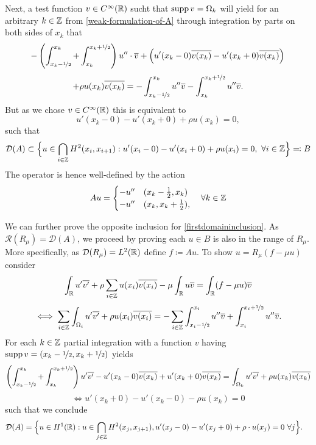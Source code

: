 Next, a test function $v \in C^{\infty}(\mathbb{R})$ sucht that $\operatorname{supp} v = \Omega_{k}$ will yield for an arbitrary $k \in \mathbb{Z}$ from \eqref{weak-formulation-of-A}   through integration by parts on both sides of $x_{k}$ that
	\[ -\left( \int_{x_{k}-\nicefrac{1}{2}}^{x_{k}} + \int_{x_{k}}^{x_{k} + \nicefrac{1}{2}}\right) u'' \cdot \overline{v} + \left( u'(x_{k}-0) \overline{v(x_{k})} - u'(x_{k} + 0) \overline{v(x_{k})} \right) \\ \]
	\[ +  \rho u(x_{k})\overline{v(x_{k})} = - \int_{x_{k} - \nicefrac{1}{2}}^{x_{k}} u'' \overline{v} - \int_{x_{k}}^{x_{k} + \nicefrac{1}{2}} u'' \overline{v}. \]
But as we chose $v \in C^{\infty}(\mathbb{R})$ this is equivalent to
	\[ u'(x_{k}-0) - u'(x_{k}+0) + \rho u(x_{k}) = 0, \]
such that
	\begin{equation}
		\mathcal{D}(A) \subset \Big\{ u \in \bigcap_{i \in \mathbb{Z}} H^{2}(x_{i}, x_{i + 1}) : u'(x_{i} - 0) - u'(x_{i} + 0) + \rho u(x_{i}) = 0 , ~\forall i \in \mathbb{Z} \Big\} \eqqcolon B \label{firstdomaininclusion}
	\end{equation} 
The operator is hence well-defined by the action
	\[ A u = \begin{cases}
					- u'' & (x_{k} - \frac{1}{2}, x_{k}) \\
					- u'' & (x_{k}, x_{k} + \frac{1}{2}),
			 \end{cases} \quad \forall k \in \mathbb{Z} \]
				
We can further prove the opposite inclusion for \eqref{firstdomaininclusion}. As $\mathcal{R}(R_{\mu}) = \mathcal{D}(A)$, we proceed by proving each $u \in B$ is also in the range of $R_{\mu}$. More specifically, as $\mathcal{D}(R_{\mu}) = L^{2}(\mathbb{R})$ define $f \coloneqq A u$. To show $u = R_{\mu}(f - \mu u)$ consider
	\[ \int_{\mathbb{R}} u' \overline{v'} + \rho \sum_{i \in \mathbb{Z}} u(x_{i}) \overline{v(x_{i})} - \mu \int_{\mathbb{R}} u \overline{v}= \int_{\mathbb{R}}(f-\mu u) \overline{v} \]
	\[ \iff \sum_{i \in \mathbb{Z}} \int_{\Omega_{i}} u' \overline{v'} + \rho u(x_{i}) \overline{v(x_{i})} = - \sum_{i \in \mathbb{Z}} \int_{x_{i} - \nicefrac{1}{2}}^{x_{i}} u'' \overline{v} + \int_{x_{i}}^{x_{i} + \nicefrac{1}{2}} u'' \overline{v}. \]
	For each $k \in \mathbb{Z}$ partial integration with a function $v$ having $\operatorname{supp} v = (x_{k} - \nicefrac{1}{2}, x_{k} + \nicefrac{1}{2})$ yields
	\[ \left( \int_{x_{k} - \nicefrac{1}{2}}^{x_{k}} + \int_{x_{k}}^{x_{k} +\nicefrac{1}{2}} \right) u' \overline{v'} - u'(x_{k}-0) \overline{v(x_{k})}  + u'(x_{k}+0) \overline{v(x_{k})}  = \int_{\Omega_{k}} u' \overline{v'} + \rho u(x_{k}) \overline{v(x_{k})} \]
	\[ \iff u'(x_{k}+0) - u'(x_{k}-0) - \rho u(x_{k}) = 0 \]
	such that we conclude
	\begin{align*}
		\mathcal{D}(A) & = \Big\{ u \in H^{1}(\mathbb{R}): u \in \bigcap_{j \in \mathbb{Z}} H^{2}(x_{j} , x_{j+1}), u'(x_{j} - 0) - u'(x_{j} + 0) + \rho \cdot u(x_{j}) = 0 ~\forall j \Big\}.
	\end{align*}
~\newpage %

